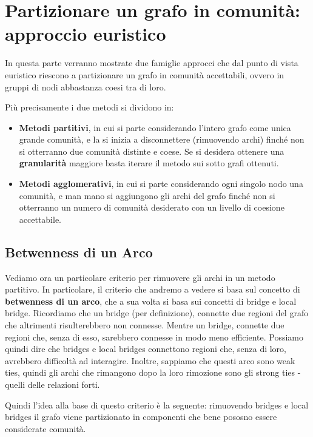 \newpage

\section{Partizionare un grafo in comunità:
approccio euristico}

In questa parte verranno mostrate due famiglie approcci che dal punto di vista euristico riescono a partizionare un grafo in comunità accettabili, ovvero in gruppi di nodi abbastanza coesi tra di loro.

Più precisamente i due metodi si dividono in:
\begin{itemize}
    \item \textbf{Metodi partitivi}, in cui si parte considerando l'intero grafo come unica grande comunità, e la si inizia a disconnettere (rimuovendo archi) finché non si otterranno due comunità distinte e coese. Se si desidera ottenere una \textbf{granularità} maggiore basta iterare il metodo sui sotto grafi ottenuti.
    \item \textbf{Metodi agglomerativi}, in cui si parte considerando ogni singolo nodo una comunità, e man mano si aggiungono gli archi del grafo finché non si otterranno un numero di comunità desiderato con un livello di coesione accettabile.
\end{itemize}

\subsection{Betwenness di un Arco}

Vediamo ora un particolare criterio per rimuovere gli archi in un metodo partitivo. In particolare, il criterio che andremo a vedere si basa sul concetto di \textbf{betwenness di un arco}, che a sua volta si basa sui concetti di bridge e local bridge. Ricordiamo che un bridge (per definizione), connette due regioni del grafo che altrimenti risulterebbero non connesse. Mentre un bridge, connette due regioni che, senza di esso, sarebbero connesse in modo meno efficiente. Possiamo quindi dire che bridges e local bridges connettono regioni che, senza di loro, avrebbero difficoltà ad interagire. Inoltre, sappiamo che questi arco sono weak ties, quindi gli archi che rimangono dopo la loro rimozione sono gli strong ties - quelli delle relazioni forti.

Quindi l'idea alla base di questo criterio è la seguente: rimuovendo bridges e local bridges il grafo viene partizionato in componenti che bene pososno essere considerate comunità.

